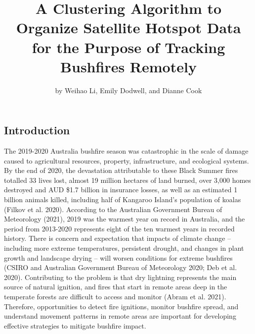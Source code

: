 \title{A Clustering Algorithm to Organize Satellite Hotspot Data for the Purpose of Tracking Bushfires Remotely}
\author{by Weihao Li, Emily Dodwell, and Dianne Cook}

\maketitle


\hypertarget{introduction}{%
\subsection{Introduction}\label{introduction}}

The 2019-2020 Australia bushfire season was catastrophic in the scale of damage caused to agricultural resources, property, infrastructure, and ecological systems. By the end of 2020, the devastation attributable to these Black Summer fires totalled 33 lives lost, almost 19 million hectares of land burned, over 3,000 homes destroyed and AUD \$1.7 billion in insurance losses, as well as an estimated 1 billion animals killed, including half of Kangaroo Island's population of koalas (Filkov et al. 2020). According to the Australian Government Bureau of Meteorology (2021), 2019 was the warmest year on record in Australia, and the period from 2013-2020 represents eight of the ten warmest years in recorded history. There is concern and expectation that impacts of climate change -- including more extreme temperatures, persistent drought, and changes in plant growth and landscape drying -- will worsen conditions for extreme bushfires (CSIRO and Australian Government Bureau of Meteorology 2020; Deb et al. 2020). Contributing to the problem is that dry lightning represents the main source of natural ignition, and fires that start in remote areas deep in the temperate forests are difficult to access and monitor (Abram et al. 2021). Therefore, opportunities to detect fire ignitions, monitor bushfire spread, and understand movement patterns in remote areas are important for developing effective strategies to mitigate bushfire impact.

